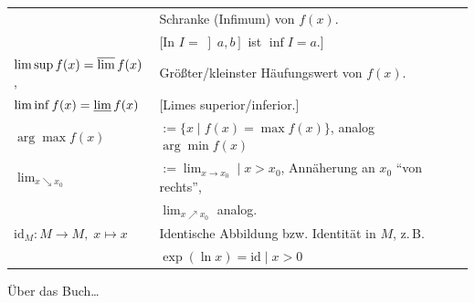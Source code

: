 \documentclass[english,ngerman,fontsize=9pt,intoc,index=totoc,refpage,listof=totoc,draft]{scrbook}
\numberwithin{equation}{section}
\let\cleardoublepage\clearpage
\begin{document}
\begin{center}
\begin{longtable}{l|l}
	                                         & Schranke (Infimum) von $f(x)$.                                                \\
	                                         & [In $I = \left]a,b\right]$ ist $\inf I = a$.]                                 \\[0.666em]
	$\limsup f(x) = \varlimsup f(x)$,        & Größter/kleinster Häufungswert von $f(x)$.                                    \\
	$\liminf f(x) = \varliminf f(x)$         & [Limes superior/inferior.]                                                    \\[0.666em]
	$\arg\max f(x)$                          & $:= \{ x \mid f(x) = \max f(x) \}$, analog $\arg\min f(x)$                    \\[0.666em]
	$\lim_{x \searrow x_0}$                  & $:= \lim_{x \to x_0} \mid x>x_0$, Annäherung an $x_0$ \enquote{von rechts},         \\
	                                         & $\lim_{x \nearrow x_0}$ analog.                                               \\[0.666em]
	$\mathrm{id}_M : M \to M,\; x \mapsto x$ & Identische Abbildung bzw. Identität in $M$, z.\,B.                            \\
	                                         & $\exp(\ln x)=\mathrm{id} \mid x>0$
\end{longtable}
\end{center}


\backmatter



\footnotesize
\printindex
\normalsize

\cleardoublepage
{}
\markboth{\nomname}{\nomname}

\printnoidxglossary{}

\label{literaturverzeichnis}
\nocite{*}
\printbibliography


\todos{}

\clearpage\pagestyle{blank}
\ifthispageodd{\hbox{}\clearpage}{}

{\huge\sffamily Über das Buch\ldots}
\end{document}

